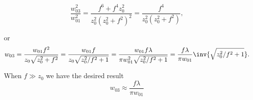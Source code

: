 {\begin{dmath}\label{eqn:problemSet4Problem1:260}
\frac{w_{03}^2}{w_{01}^2} 
= \frac{
f^6 + f^4 z_0^2
}{z_0^2 \left(z_0^2 + f^2\right)^2 }
= 
\frac{f^4}{z_0^2\left(z_0^2 + f^2\right) },
\end{dmath}

or
\begin{dmath}\label{eqn:problemSet4Problem1:280}
w_{03}
= 
\frac{w_{01} f^2}{z_0 \sqrt{z_0^2 + f^2} }
= 
\frac{w_{01} f}{z_0 \sqrt{z_0^2/f^2 + 1} }
=
\frac{w_{01} f \lambda}{\pi w_{01}^2 \sqrt{z_0^2/f^2 + 1} }
=
\frac{f \lambda}{\pi w_{01}} \inv{\sqrt{z_0^2/f^2 + 1} }.
\end{dmath}

When $f \gg z_0$ we have the desired result
\begin{dmath}\label{eqn:problemSet4Problem1:300}
\boxed{
w_{03}
\approx
\frac{f \lambda}{\pi w_{01}} 
}
\end{dmath}

}

